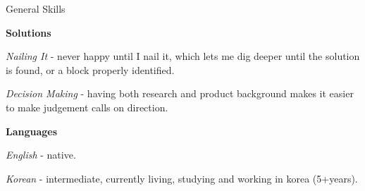 \documentclass[a4paper,10pt]{article}
\begin{document}
\begin{cvsection}{General Skills}
\begin{djs_itemize}
    \item \textbf{Solutions}
    \begin{djs_itemize}
      \item \textit{Nailing It} - never happy until I nail it, which lets me dig deeper until the solution is found, or a block properly identified.
      \item \textit{Decision Making} - having both research and product background makes it easier to make judgement calls on direction.
    \end{djs_itemize}
    \item \textbf{Languages}
    \begin{djs_itemize}
      \item \textit{English} - native.
      \item \textit{Korean} - intermediate, currently living, studying and working in korea (5+years).
    \end{djs_itemize}
  \end{djs_itemize}
\end{cvsection}

\vspace{2em}
\end{document}
